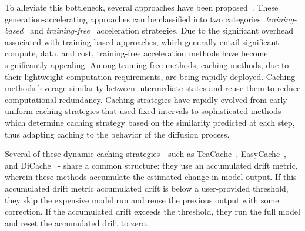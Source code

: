 \documentclass{article}
\begin{document}
To alleviate this bottleneck, several approaches have been proposed~\cite{lu2022dpmsolver, li2024svdquant, liu2025teacache}.
These generation-accelerating approaches can be classified into two categories: \emph{training-based}~\cite{meng2023distillation, sauer2024adversarial, wang2023videolcm, chen2025qdit, ma2024learningtocache, li2024svdquant} and \emph{training-free}~\cite{zhang2025spargeattn, xi2025sparsevideogen, ren2025grouping, lu2022dpmsolver, liu2025teacache} acceleration strategies.
Due to the significant overhead~\cite{bu2025dicache, zhou2025easycache, liu2025teacache} associated with training-based approaches, which generally entail significant compute, data, and cost, training-free acceleration methods have become significantly appealing. Among training-free methods, caching methods, due to their lightweight computation requirements, are being rapidly deployed. Caching methods leverage similarity between intermediate states and reuse them to reduce computational redundancy. Caching strategies have rapidly evolved from early uniform caching strategies that used fixed intervals to sophisticated methods~\cite{kahatapitiya2024adacache, liu2025teacache, zhou2025easycache, liu2025taylorseers, bu2025dicache} which determine caching strategy based on the similarity predicted at each step, thus adapting caching to the behavior of the diffusion process.

% 

Several of these dynamic caching strategies - such as TeaCache~\cite{liu2025teacache}, EasyCache~\cite{zhou2025easycache}, and DiCache~\cite{bu2025dicache} - share a common structure: they use an accumulated drift metric, wherein these methods accumulate the 
estimated change in model output. If this accumulated drift metric  
accumulated drift is below a user-provided threshold, they skip the expensive model run and reuse the previous output with some correction. If the accumulated drift exceeds the threshold, they run the full model and reset the accumulated drift to zero.
\end{document}

